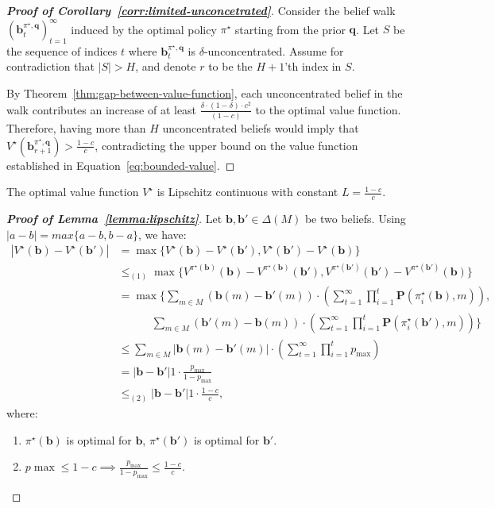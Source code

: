 \begin{proof}[\normalfont\bfseries Proof of Corollary~\ref{corr:limited-unconcetrated}]
    Consider the belief walk $(\bm{b}^{\pi^{\star}, \bm{q}}_t)_{t=1}^{\infty}$ induced by the optimal policy $\pi^{\star}$ starting from the prior $\bm{q}$. Let $S$ be the sequence of indices $t$ where $\bm{b}^{\pi^{\star}, \bm{q}}_t$ is $\delta$-unconcentrated. Assume for contradiction that $|S| > H$, and denote $r$ to be the $H+1$'th index in $S$. 
    
    By Theorem~\ref{thm:gap-between-value-function}, each unconcentrated belief in the walk contributes an increase of at least $\frac{\delta \cdot (1 - \delta) \cdot c^2}{(1 - c)}$ to the optimal value function. Therefore, having more than $H$ unconcentrated beliefs would imply that $V^{\star}(\bm{b}^{\pi^{\star}, \bm{q}}_{r+1}) > \frac{1-c}{c}$, contradicting the upper bound on the value function established in Equation~\eqref{eq:bounded-value}.
\end{proof}

\begin{lemma}
    \label{lemma:lipschitz}
    The optimal value function $V^\star$ is Lipschitz continuous with constant $L = \frac{1-c}{c}$.
\end{lemma}

\begin{proof}[\normalfont\bfseries Proof of Lemma~\ref{lemma:lipschitz}]
Let $\bm b, \bm b' \in \Delta(M)$ be two beliefs. Using $|a-b| = max\{a-b, b-a\}$, we have:
\begin{align*}
|V^{\star}(\mathbf{b}) - V^{\star}(\mathbf{b}')| &= \max\{V^{\star}(\mathbf{b}) - V^{\star}(\mathbf{b}'), V^{\star}(\mathbf{b}') - V^{\star}(\mathbf{b})\} \\
&\leq_{(1)} \max\{V^{\pi^{\star}(\mathbf{b})}(\mathbf{b}) - V^{\pi^{\star}(\mathbf{b})}(\mathbf{b}'), V^{\pi^{\star}(\mathbf{b}')}(\mathbf{b}') - V^{\pi^{\star}(\mathbf{b}')}(\mathbf{b})\} \\
&= \max\{\sum_{m \in M} (\mathbf{b}(m) - \mathbf{b}'(m)) \cdot \left( \sum_{t=1}^{\infty} \prod_{i=1}^{t} \mathbf{P}(\pi^\star_i(\mathbf{b}), m) \right), \\
&\quad\quad\quad \sum_{m \in M} (\mathbf{b}'(m) - \mathbf{b}(m)) \cdot \left( \sum_{t=1}^{\infty} \prod_{i=1}^{t} \mathbf{P}(\pi^\star_i(\mathbf{b}'), m) \right)\} \\
&\leq \sum_{m \in M} |\mathbf{b}(m) - \mathbf{b}'(m)| \cdot \left( \sum_{t=1}^{\infty} \prod_{i=1}^{t} p_{\max} \right) \\
&= |\mathbf{b} - \mathbf{b}'|1 \cdot \frac{p_{\max}}{1-p_{\max}} \\
&\leq_{(2)} |\mathbf{b} - \mathbf{b}'|1 \cdot \frac{1-c}{c},
\end{align*}
where:
\begin{enumerate}
    \item $\pi^{\star}(\mathbf{b})$ is optimal for $\bm b$, $\pi^{\star}(\mathbf{b'})$ is optimal for $\bm b'$.
    \item $p{\max} \leq 1 - c \implies \frac{p_{\max}}{1-p_{\max}} \leq \frac{1-c}{c}$.
\end{enumerate}
\end{proof}

